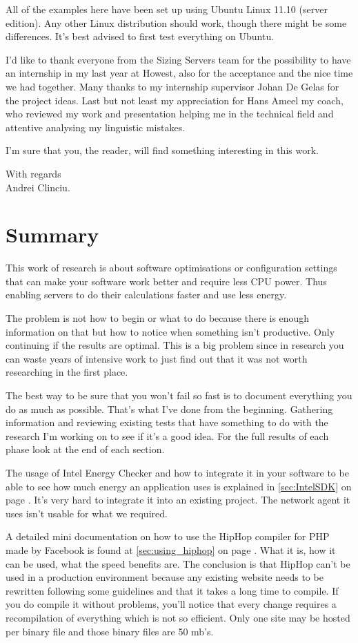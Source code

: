 All of the examples here have been set up using Ubuntu Linux 11.10 (server edition).
Any other Linux distribution should work, though there might be some differences. It's best advised to first test everything on Ubuntu.

I'd like to thank everyone from the Sizing Servers team for the possibility to have an internship in my last year at Howest, also for the acceptance and the nice time we had together.
Many thanks to my internship supervisor Johan De Gelas for the project ideas. 
Last but not least my appreciation for Hans Ameel my coach, who reviewed my work and presentation helping me in the technical field and attentive analysing my linguistic mistakes.

I'm sure that you, the reader, will find something interesting  in this work.

With regards
\\Andrei Clinciu.

\clearpage{}
\section*{Summary}
This work of research is about software optimisations or configuration settings that can make your software work better and require less CPU power. 
Thus enabling servers to do their calculations faster and use less energy. 

The problem is not how to begin or what to do because there is enough information on that but how to notice when something isn't productive.
Only continuing if the results are optimal.
This is a big problem since in research you can waste years of intensive work to just find out that it was not worth researching in the first place.

The best way to be sure that you won't fail so fast is to document everything you do as much as possible. 
That's what I've done from the beginning. Gathering information and reviewing existing tests that have something to do with the research I'm working on to see if it's a good idea. 
For the full results of each phase look at the end of each section.

The usage of Intel Energy Checker and how to integrate it in your software to be able to see how much energy an application uses is explained in \autoref{sec:IntelSDK} on page \pageref{sec:IntelSDK}.
It's very hard to integrate it into an existing project. The network agent it uses isn't usable for what we required. 

A detailed mini documentation on how to use the HipHop  compiler for PHP made by Facebook is found at \autoref{sec:using_hiphop} on page \pageref{sec:using_hiphop}. What it is, how it can be used, what the speed benefits are. 
The conclusion is that HipHop can't be used in a production environment because  any existing website needs to be rewritten following some guidelines 
and that it takes a long time to compile. If you do compile it without problems, you'll notice that every change requires a recompilation of everything which is not so efficient. 
Only one site may be hosted per binary file and those binary files are 50 mb's.

